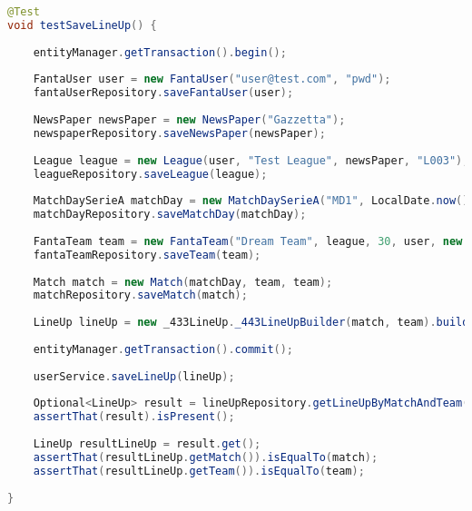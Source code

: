 \begin{lstlisting}[language=Java]
@Test
void testSaveLineUp() {
		
	entityManager.getTransaction().begin();
		
	FantaUser user = new FantaUser("user@test.com", "pwd");
	fantaUserRepository.saveFantaUser(user);
		
	NewsPaper newsPaper = new NewsPaper("Gazzetta");
	newspaperRepository.saveNewsPaper(newsPaper);
		
	League league = new League(user, "Test League", newsPaper, "L003");
	leagueRepository.saveLeague(league);
		
	MatchDaySerieA matchDay = new MatchDaySerieA("MD1", LocalDate.now().plusWeeks(1)); // Monday
	matchDayRepository.saveMatchDay(matchDay);
		
	FantaTeam team = new FantaTeam("Dream Team", league, 30, user, new HashSet<>());
	fantaTeamRepository.saveTeam(team);
		
	Match match = new Match(matchDay, team, team);
	matchRepository.saveMatch(match);
		
	LineUp lineUp = new _433LineUp._443LineUpBuilder(match, team).build();
		
	entityManager.getTransaction().commit();
		
	userService.saveLineUp(lineUp);
		
	Optional<LineUp> result = lineUpRepository.getLineUpByMatchAndTeam(match, team);
	assertThat(result).isPresent();
		
	LineUp resultLineUp = result.get();
	assertThat(resultLineUp.getMatch()).isEqualTo(match);
	assertThat(resultLineUp.getTeam()).isEqualTo(team);
		
}
\end{lstlisting}

